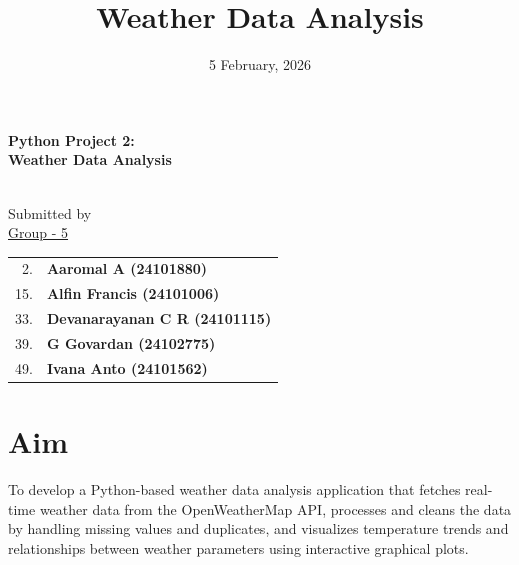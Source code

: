 \documentclass[a4paper]{article}
\begin{document}
\begin{titlepage}
    \centering
    \vspace*{1in}
    
    {\Large \textbf{Python Project 2:}} \\
    \vspace{0.4in}
    {\huge \textbf{Weather Data Analysis}} \\
    \vspace{0.6in}
     \\
    \vspace{0.8in}
    
    {\large Submitted by} \\
    \vspace{0.2in}
    {\large \underline{Group - 5}} \\
    \vspace{0.2in}
    
    {\large
    \begin{tabular}{rl}
         2. & \textbf{Aaromal A (24101880)} \\
        15. & \textbf{Alfin Francis (24101006)} \\
        33. & \textbf{Devanarayanan C R (24101115)} \\
        39. & \textbf{G Govardan (24102775)} \\
        49. & \textbf{Ivana Anto (24101562)}
    \end{tabular}}
    
    \vfill
\end{titlepage}
\restoregeometry %
\newpage

\title{Weather Data Analysis}
\author{}
\date{5 February, 2026}
\maketitle

\section*{Aim}

To develop a Python-based weather data analysis application that fetches real-time weather data from the OpenWeatherMap API, processes and cleans the data by handling missing values and duplicates, and visualizes temperature trends and relationships between weather parameters using interactive graphical plots.
\end{document}
